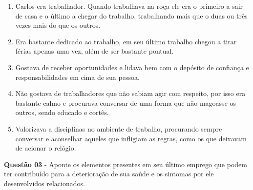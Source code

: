 \begin{description}
        \begin{enumerate}
            \item Carlos era trabalhador. Quando trabalhava na roça ele era o primeiro a sair de casa e o último a chegar do trabalho, trabalhando mais que o duas ou três vezes mais do que os outros.
            \item Era bastante dedicado ao trabalho, em seu último trabalho chegou a tirar férias apenas uma vez, além de ser bastante pontual.
            \item Gostava de receber oportunidades e lidava bem com o depósito de confiança e responsabilidades em cima de sua pessoa. 
            \item Não gostava de trabalhadores que não sabiam agir com respeito, por isso era bastante calmo e procurava conversar de uma forma que não magoasse os outros, sendo educado e cortês.   
            \item Valorizava a disciplinas no ambiente de trabalho, procurando sempre conversar e aconselhar aqueles que infligiam as regras, como os que deixavam de acionar o relógio.
            
        \end{enumerate}
        
        \item \textbf{Questão 03} - Aponte os elementos presentes em seu último emprego que podem ter contribuído para a deterioração de sua saúde e os sintomas por ele desenvolvidos relacionados. 
        

\end{description}
